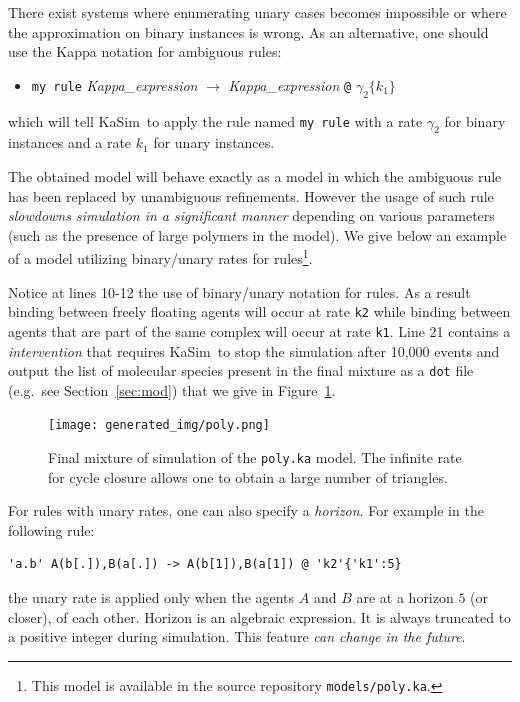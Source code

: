 \documentclass[11pt]{book}
\def\KaSim{\textsf{KaSim}}
\def\ttt#1{\texttt{#1}}
\def\rar{\rightarrow}
\def\ga{\gamma}
\def\eg{e.g.~}
\def\ITE#1{\begin{itemize}#1\end{itemize}}
\begin{document}
There exist systems where enumerating unary cases becomes impossible
or where the approximation on binary instances is wrong. As an
alternative, one should use the Kappa notation for ambiguous rules:
\ITE{
\item[] \ttt{{\textquotesingle}my rule{\textquotesingle}} {\it
  Kappa\_expression} $\rar$ {\it Kappa\_expression} \ttt{@} $\ga_2
  \{k_1\}$ } which will tell \KaSim~to apply the rule named
\ttt{{\textquotesingle}my rule{\textquotesingle}} with a rate $\ga_2$
for binary instances and a rate $k_1$ for unary instances.

The obtained model will behave exactly as a model in which the
ambiguous rule has been replaced by unambiguous refinements. However
the usage of such rule \emph{slowdowns simulation in a significant
  manner} depending on various parameters (such as the presence of
large polymers in the model). We give below an example of a model
utilizing binary/unary rates for rules\footnote{This model is
  available in the source repository \ttt{models/poly.ka}.}.



Notice at lines 10-12 the use of binary/unary notation for rules. As a
result binding between freely floating agents will occur at rate
\ttt{{\textquotesingle}k2{\textquotesingle}} while binding between
agents that are part of the same complex will occur at rate
\ttt{{\textquotesingle}k1{\textquotesingle}}. Line 21 contains a
\emph{intervention} that requires \KaSim~to stop the simulation after
10,000 events and output the list of molecular species present in the
final mixture as a \texttt{dot} file ({\eg}see Section~\ref{sec:mod})
that we give in Figure~\ref{fig:species}.

\begin{figure}[htbp]
\begin{center}
\texttt{[image: generated\_img/poly.png]}
\caption{Final mixture %
  of simulation of the \ttt{poly.ka} model. The infinite rate for
  cycle closure allows one to obtain a large number of triangles.}
\label{fig:species}
\end{center}
\end{figure}

For rules with unary rates, one can also specify a \emph{horizon}.
For example in the following rule:
\begin{lstlisting}[language=kappa]
'a.b' A(b[.]),B(a[.]) -> A(b[1]),B(a[1]) @ 'k2'{'k1':5}
\end{lstlisting}
the unary rate is applied only when the agents $A$ and $B$ are at a
horizon $5$ (or closer), of each other. Horizon is an algebraic
expression. It is always truncated to a positive integer during
simulation.  This feature \emph{can change in the future}.
\end{document}
